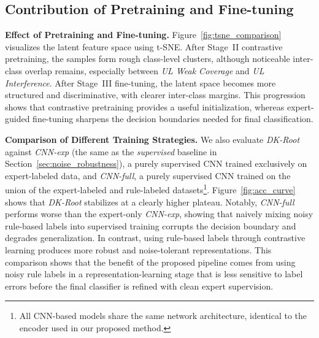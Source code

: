 \documentclass[lettersize,journal]{IEEEtran}
\begin{document}
{\subsection{Contribution of Pretraining and Fine-tuning}
\label{sec:pretrain_finetune}

\noindent\textbf{Effect of Pretraining and Fine-tuning.}  
Figure~\ref{fig:tsne_comparison} visualizes the latent feature space using t-SNE. After Stage~II contrastive pretraining, the samples form rough class-level clusters, although noticeable inter-class overlap remains, especially between \textit{UL Weak Coverage} and \textit{UL Interference}. After Stage~III fine-tuning, the latent space becomes more structured and discriminative, with clearer inter-class margins. This progression shows that contrastive pretraining provides a useful initialization, whereas expert-guided fine-tuning sharpens the decision boundaries needed for final classification.


\noindent\textbf{Comparison of Different Training Strategies.}  
We also evaluate \textit{DK-Root} against \textit{CNN-exp} (the same as the \textit{supervised} baseline in Section~\ref{sec:noise_robustness}), a purely supervised CNN trained exclusively on expert-labeled data, and \textit{CNN-full}, a purely supervised CNN trained on the union of the expert-labeled and rule-labeled datasets\footnote{All CNN-based models share the same network architecture, identical to the encoder used in our proposed method.}. 
Figure~\ref{fig:acc_curve} shows that \textit{DK-Root} stabilizes at a clearly higher plateau. Notably, \textit{CNN-full} performs worse than the expert-only \textit{CNN-exp}, showing that naively mixing noisy rule-based labels into supervised training corrupts the decision boundary and degrades generalization. In contrast, using rule-based labels through contrastive learning produces more robust and noise-tolerant representations. This comparison shows that the benefit of the proposed pipeline comes from using noisy rule labels in a representation-learning stage that is less sensitive to label errors before the final classifier is refined with clean expert supervision.

{\color{AEcolor}

}}
\end{document}

